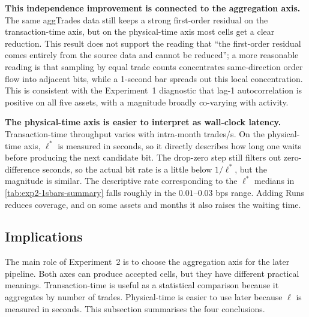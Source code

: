 \documentclass[11pt,titlepage,openany,oneside]{book}  %
\begin{document}
\textbf{This independence improvement is connected to the aggregation axis.} The same aggTrades data still keeps a strong first-order residual on the transaction-time axis, but on the physical-time axis most cells get a clear reduction. This result does not support the reading that ``the first-order residual comes entirely from the source data and cannot be reduced''; a more reasonable reading is that sampling by equal trade counts concentrates same-direction order flow into adjacent bits, while a 1-second bar spreads out this local concentration. This is consistent with the Experiment~1 diagnostic that lag-1 autocorrelation is positive on all five assets, with a magnitude broadly co-varying with activity.

\textbf{The physical-time axis is easier to interpret as wall-clock latency.} Transaction-time throughput varies with intra-month trades/s. On the physical-time axis, $\ell^*$ is measured in seconds, so it directly describes how long one waits before producing the next candidate bit. The drop-zero step still filters out zero-difference seconds, so the actual bit rate is a little below $1/\ell^*$, but the magnitude is similar. The descriptive rate corresponding to the $\ell^*$ medians in \cref{tab:exp2-1sbars-summary} falls roughly in the $0.01$--$0.03$ bps range. Adding Runs reduces coverage, and on some assets and months it also raises the waiting time.

\FloatBarrier %

\subsection{Implications}
\label{sec:exp2-implications}

The main role of Experiment~2 is to choose the aggregation axis for the later pipeline. Both axes can produce accepted cells, but they have different practical meanings. Transaction-time is useful as a statistical comparison because it aggregates by number of trades. Physical-time is easier to use later because $\ell$ is measured in seconds. This subsection summarises the four conclusions.
\end{document}
